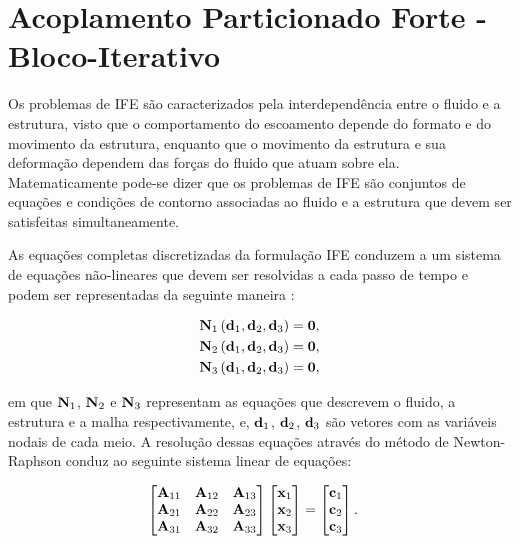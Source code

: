 \documentclass[tese_patricia]{subfiles}
\begin{document}
\section{Acoplamento Particionado Forte - Bloco-Iterativo}

Os problemas de IFE são caracterizados pela interdependência entre o fluido e a estrutura, visto que o comportamento do escoamento depende do formato e do movimento da estrutura, enquanto que o movimento da estrutura e sua deformação dependem das forças do fluido que atuam sobre ela. Matematicamente pode-se dizer que os problemas de IFE são conjuntos de equações e condições de contorno associadas ao fluido e a estrutura que devem ser satisfeitas simultaneamente.

As equações completas discretizadas da formulação IFE conduzem a um sistema de equações não-lineares que devem ser resolvidas a cada passo de tempo e podem ser representadas da seguinte maneira \cite{BazilevsTT:2013}:

\begin{align}
	\mathbf{N}_{1}\left(\mathbf{d}_{1},\mathbf{d}_{2},\mathbf{d}_{3}\right) = \mathbf{0}, \label{eq:N1}\\ 
	\mathbf{N}_{2}\left(\mathbf{d}_{1},\mathbf{d}_{2},\mathbf{d}_{3}\right) = \mathbf{0},\label{eq:N2}\\
	\mathbf{N}_{3}\left(\mathbf{d}_{1},\mathbf{d}_{2},\mathbf{d}_{3}\right) = \mathbf{0} \label{eq:N3},
\end{align}

\noindent em que $\mathbf{N}_{1}$, $\mathbf{N}_{2}$ e $\mathbf{N}_{3}$ representam as equações que descrevem o fluido, a estrutura e a malha respectivamente, e, $\mathbf{d}_{1}$, $\mathbf{d}_{2}$, $\mathbf{d}_{3}$ são vetores com as variáveis nodais de cada meio. 
A resolução dessas equações através do método de Newton-Raphson conduz ao seguinte sistema linear de equações:

\begin{align}
	\begin{bmatrix}
		\mathbf{A}_{11} & \mathbf{A}_{12} & \mathbf{A}_{13} \\
		\mathbf{A}_{21} & \mathbf{A}_{22} & \mathbf{A}_{23} \\
		\mathbf{A}_{31} & \mathbf{A}_{32} & \mathbf{A}_{33}
	\end{bmatrix}
	\begin{bmatrix}
		\mathbf{x}_{1} \\
		\mathbf{x}_{2} \\
		\mathbf{x}_{3}
	\end{bmatrix}
	&=
	\begin{bmatrix}
		\mathbf{c}_{1} \\
		\mathbf{c}_{2} \\
		\mathbf{c}_{3}
	\end{bmatrix}.
	\label{eq:sist_lin_IFE}
\end{align}	
\end{document}
